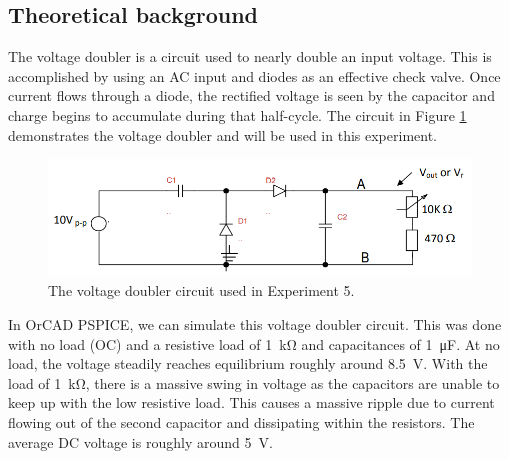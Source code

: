 \documentclass{report}
\begin{document}
\subsection{Theoretical background}
The voltage doubler is a circuit used to nearly double an input voltage. This is accomplished by using an AC input and diodes as an effective check valve. Once current flows through a diode, the rectified voltage is seen by the capacitor and charge begins to accumulate during that half-cycle. The circuit in Figure \ref{fig:exp5ckt} demonstrates the voltage doubler and will be used in this experiment.
\begin{figure}[h]
	\centering
	\includegraphics[width=0.7\linewidth]{exp5ckt}
	\caption{The voltage doubler circuit used in Experiment 5.}
	\label{fig:exp5ckt}
\end{figure}

In OrCAD PSPICE, we can simulate this voltage doubler circuit. This was done with no load (OC) and a resistive load of \SI{1}{\kohm} and capacitances of \SI{1}{\micro\farad}. At no load, the voltage steadily reaches equilibrium roughly around \SI{8.5}{\V}. With the load of \SI{1}{\kohm}, there is a massive swing in voltage as the capacitors are unable to keep up with the low resistive load. This causes a massive ripple due to current flowing out of the second capacitor and dissipating within the resistors. The average DC voltage is roughly around \SI{5}{\V}.
\end{document}
